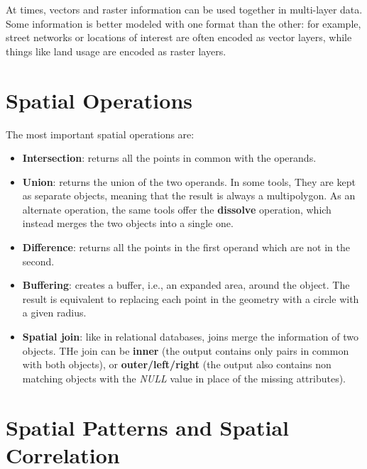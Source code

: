 At times, vectors and raster information can be used together in multi-layer data. Some information is better modeled with one format than the other: for example, street networks or locations of interest are often encoded as vector layers, while things like land usage are encoded as raster layers.

\section{Spatial Operations}

The most important spatial operations are:
\begin{itemize}
    \item \textbf{Intersection}: returns all the points in common with the operands.
    \item \textbf{Union}: returns the union of the two operands. In some tools, They are kept as separate objects, meaning that the result is always a multipolygon. As an alternate operation, the same tools offer the \textbf{dissolve} operation, which instead merges the two objects into a single one.
    \item \textbf{Difference}: returns all the points in the first operand which are not in the second.
    \item \textbf{Buffering}: creates a buffer, i.e., an expanded area, around the object. The result is equivalent to replacing each point in the geometry with a circle with a given radius.
    \item \textbf{Spatial join}: like in relational databases, joins merge the information of two objects. THe join can be \textbf{inner} (the output contains only pairs in common with both objects), or \textbf{outer/left/right} (the output also contains non matching objects with the \textit{NULL} value in place of the missing attributes). 
\end{itemize}

\section{Spatial Patterns and Spatial Correlation}


